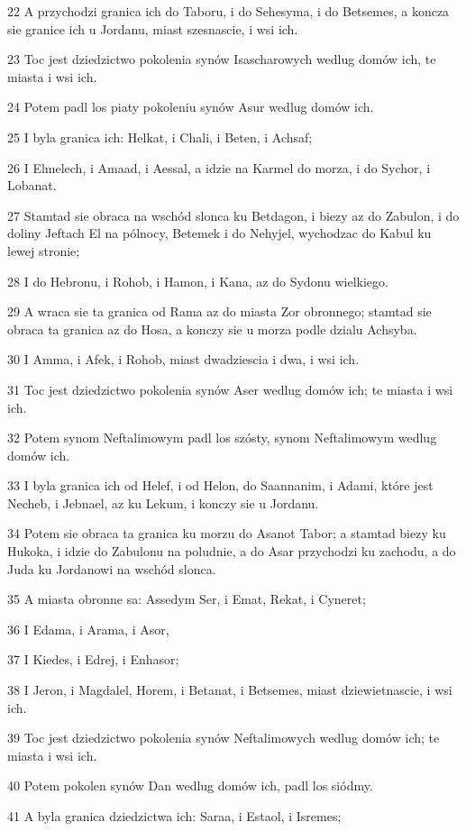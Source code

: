 \par 22 A przychodzi granica ich do Taboru, i do Sehesyma, i do Betsemes, a koncza sie granice ich u Jordanu, miast szesnascie, i wsi ich.
\par 23 Toc jest dziedzictwo pokolenia synów Isascharowych wedlug domów ich, te miasta i wsi ich.
\par 24 Potem padl los piaty pokoleniu synów Asur wedlug domów ich.
\par 25 I byla granica ich: Helkat, i Chali, i Beten, i Achsaf;
\par 26 I Elmelech, i Amaad, i Aessal, a idzie na Karmel do morza, i do Sychor, i Lobanat.
\par 27 Stamtad sie obraca na wschód slonca ku Betdagon, i biezy az do Zabulon, i do doliny Jeftach El na pólnocy, Betemek i do Nehyjel, wychodzac do Kabul ku lewej stronie;
\par 28 I do Hebronu, i Rohob, i Hamon, i Kana, az do Sydonu wielkiego.
\par 29 A wraca sie ta granica od Rama az do miasta Zor obronnego; stamtad sie obraca ta granica az do Hosa, a konczy sie u morza podle dzialu Achsyba.
\par 30 I Amma, i Afek, i Rohob, miast dwadziescia i dwa, i wsi ich.
\par 31 Toc jest dziedzictwo pokolenia synów Aser wedlug domów ich; te miasta i wsi ich.
\par 32 Potem synom Neftalimowym padl los szósty, synom Neftalimowym wedlug domów ich.
\par 33 I byla granica ich od Helef, i od Helon, do Saannanim, i Adami, które jest Necheb, i Jebnael, az ku Lekum, i konczy sie u Jordanu.
\par 34 Potem sie obraca ta granica ku morzu do Asanot Tabor; a stamtad biezy ku Hukoka, i idzie do Zabulonu na poludnie, a do Asar przychodzi ku zachodu, a do Juda ku Jordanowi na wschód slonca.
\par 35 A miasta obronne sa: Assedym Ser, i Emat, Rekat, i Cyneret;
\par 36 I Edama, i Arama, i Asor,
\par 37 I Kiedes, i Edrej, i Enhasor;
\par 38 I Jeron, i Magdalel, Horem, i Betanat, i Betsemes, miast dziewietnascie, i wsi ich.
\par 39 Toc jest dziedzictwo pokolenia synów Neftalimowych wedlug domów ich; te miasta i wsi ich.
\par 40 Potem pokolen synów Dan wedlug domów ich, padl los siódmy.
\par 41 A byla granica dziedzictwa ich: Saraa, i Estaol, i Isremes;
